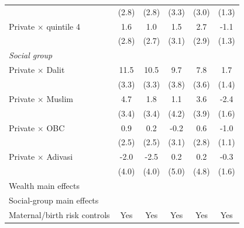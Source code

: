 {\begin{tabular}{l*{5}{c}}
            &       (2.8)         &       (2.8)         &       (3.3)         &       (3.0)         &       (1.3)         \\
\addlinespace
Private $\times$ quintile 4&         1.6         &         1.0         &         1.5         &         2.7         &        -1.1         \\
            &       (2.8)         &       (2.7)         &       (3.1)         &       (2.9)         &       (1.3)         \\
\addlinespace
\textit{Social group}&                     &                     &                     &                     &                     \\
\addlinespace
Private $\times$ Dalit&        11.5\sym{***}&        10.5\sym{***}&         9.7\sym{**} &         7.8\sym{**} &         1.7         \\
            &       (3.3)         &       (3.3)         &       (3.8)         &       (3.6)         &       (1.4)         \\
\addlinespace
Private $\times$ Muslim&         4.7         &         1.8         &         1.1         &         3.6         &        -2.4         \\
            &       (3.4)         &       (3.4)         &       (4.2)         &       (3.9)         &       (1.6)         \\
\addlinespace
Private $\times$ OBC&         0.9         &         0.2         &        -0.2         &         0.6         &        -1.0         \\
            &       (2.5)         &       (2.5)         &       (3.1)         &       (2.8)         &       (1.1)         \\
\addlinespace
Private $\times$ Adivasi&        -2.0         &        -2.5         &         0.2         &         0.2         &        -0.3         \\
            &       (4.0)         &       (4.0)         &       (5.0)         &       (4.8)         &       (1.6)         \\
\midrule
Wealth main effects&                     &                     &                     &                     &                     \\
Social-group main effects&                     &                     &                     &                     &                     \\
Maternal/birth risk controls&         Yes         &         Yes         &         Yes         &         Yes         &         Yes         \\

\end{tabular}}
